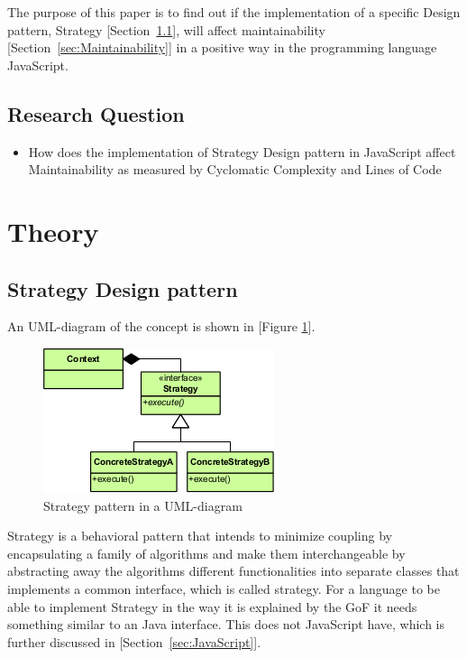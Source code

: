 \documentclass[conference, a4paper]{IEEEtran}
\begin{document}
The purpose of this paper is to find out if the implementation of a specific Design pattern, Strategy [Section~\ref{sec:Strategy}], will affect maintainability [Section~\ref{sec:Maintainability}] in a positive way in the programming language JavaScript.

\subsection{Research Question}
\begin{itemize}
	\item How does the implementation of Strategy Design pattern in JavaScript affect Maintainability as measured by Cyclomatic Complexity and Lines of Code
\end{itemize}

\section{Theory}

\subsection{Strategy Design pattern}
\label{sec:Strategy}

An UML-diagram of the concept is shown in [Figure \ref{fig:Strategy}].

\begin{figure}[ht!]
	\centering
	\includegraphics[scale=0.7]{Strategy_Pattern_in_UML.png}
	\caption{Strategy pattern in a UML-diagram}
	\label{fig:Strategy}
\end{figure}

Strategy is a behavioral pattern that intends to minimize coupling by encapsulating a family of algorithms and make them interchangeable by abstracting away the algorithms different functionalities into separate classes that implements a common interface, which is called strategy. For a language to be able to implement Strategy in the way it is explained by the GoF it needs something similar to an Java interface. This does not JavaScript have, which is further discussed in [Section~\ref{sec:JavaScript}].~\cite{bibitem:GoF}
\end{document}
